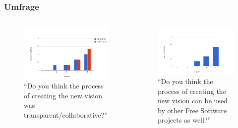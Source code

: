 \documentclass{beamer}
\begin{document}
\begin{frame}
\frametitle{Umfrage}
\begin{columns}
   \begin{figure}[h!]
    \centering
    \includegraphics[scale=0.25,keepaspectratio=true]{./amarok1ef.png}
    \caption{``Do you think the process of creating the new vision was transparent/collaborative?''}
   \end{figure}
   \begin{figure}[h!]
    \centering
    \includegraphics[scale=0.25,keepaspectratio=true]{./amarok1d.png}
    \caption{``Do you think the process of creating the new vision can be used by other Free Software projects as well?''}
   \end{figure}
\end{columns}
\end{frame}
\end{document}
